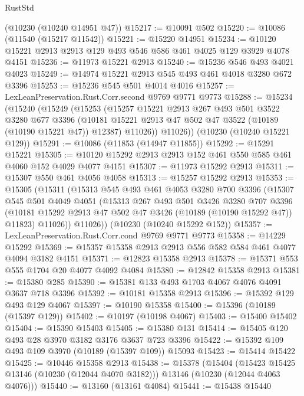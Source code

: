 \begin{lexlean}{RustStd}
\begin{coremodule}
    (@10230 (@10240 @14951 @47))
@15217 := @10091 @502
@15220 := @10086 (@11540 (@15217 @11542))
@15221 := @15220 @14951
@15234 := @10120 @15221 @2913 @2913 @129 @493 @546 @586 @461 @4025 @129 @3929 @4078 @4151
@15236 := @11973 @15221 @2913
@15240 := @15236 @546 @493 @4021 @4023
@15249 := @14974 @15221 @2913 @545 @493 @461 @4018 @3280 @672 @3396
@15253 := @15236 @545 @501 @4014 @4016
@15257 := LexLeanPreservation.Rust.Corr.second @9769 @9771 @9773
@15288 := @15234
    (@15240
      (@15249
        (@15253
          (@15257
            @15221
            @2913
            @267
            @493
            @501
            @3522
            @3280
            @677
            @3396
            (@10181 @15221 @2913 @47 @502 @47 @3522 (@10189 (@10190 @15221 @47)) @12387)
            @11026))
        @11026))
    (@10230 (@10240 @15221 @129))
@15291 := @10086 (@11853 (@14947 @11855))
@15292 := @15291 @15221
@15305 := @10120 @15292 @2913 @2913 @152 @461 @550 @585 @461 @4060 @152 @4029 @4077 @4151
@15307 := @11973 @15292 @2913
@15311 := @15307 @550 @461 @4056 @4058
@15313 := @15257 @15292 @2913
@15353 := @15305
    (@15311
      (@15313
        @545
        @493
        @461
        @4053
        @3280
        @700
        @3396
        (@15307
          @545
          @501
          @4049
          @4051
          (@15313
            @267
            @493
            @501
            @3426
            @3280
            @707
            @3396
            (@10181 @15292 @2913 @47 @502 @47 @3426 (@10189 (@10190 @15292 @47)) @11823)
            @11026))
        @11026))
    (@10230 (@10240 @15292 @152))
@15357 := LexLeanPreservation.Rust.Corr.cond @9769 @9771 @9773
@15358 := @14229 @15292
@15369 := @15357 @15358 @2913 @2913 @556 @582 @584 @461 @4077 @4094 @3182 @4151
@15371 := @12823 @15358 @2913
@15378 := @15371 @553 @555 @1704 @20 @4077 @4092 @4084
@15380 := @12842 @15358 @2913
@15381 := @15380 @285
@15390 := @15381 @133 @493 @1703 @4067 @4076 @4091 @3637 @718 @3396
@15392 := @10181 @15358 @2913
@15396 := @15392 @129 @493 @129 @4067
@15397 := @10190 @15358
@15400 := @15396 (@10189 (@15397 @129))
@15402 := @10197 (@10198 @4067)
@15403 := @15400 @15402
@15404 := @15390 @15403
@15405 := @15380 @131
@15414 := @15405 @120 @493 @28 @3970 @3182 @3176 @3637 @723 @3396
@15422 := @15392 @109 @493 @109 @3970 (@10189 (@15397 @109)) @15093
@15423 := @15414 @15422
@15425 := @10446 @15358 @2913
@15438 := @15378
    (@15404
      (@15423 @15425 @13146 (@10230 (@12044 @4070 @3182)))
      @13146
      (@10230 (@12044 @4063 @4076)))
@15440 := @13160 (@13161 @4084)
@15441 := @15438 @15440

\end{coremodule}
\end{lexlean}
